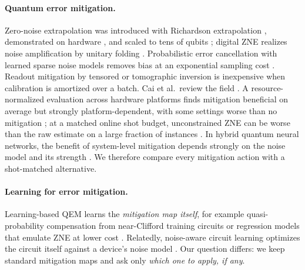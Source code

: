 \documentclass[11pt]{article}
\begin{document}
\paragraph{Quantum error mitigation.}
Zero-noise extrapolation was introduced with Richardson extrapolation \citep{temme2017error}, demonstrated on hardware \citep{kandala2019error}, and scaled to tens of qubits \citep{kim2023scalable}; digital ZNE realizes noise amplification by unitary folding \citep{giurgicatiron2020digital}.
Probabilistic error cancellation with learned sparse noise models removes bias at an exponential sampling cost \citep{vandenberg2023probabilistic}.
Readout mitigation by tensored or tomographic inversion \citep{bravyi2021mitigating,maciejewski2020mitigation} is inexpensive when calibration is amortized over a batch.
Cai et al.\ review the field \citep{cai2023quantum}.
A resource-normalized evaluation across hardware platforms finds mitigation beneficial on average but strongly platform-dependent, with some settings worse than no mitigation \citep{russo2023testing}; at a matched online shot budget, unconstrained ZNE can be worse than the raw estimate on a large fraction of instances \citep{zhang2026worse}.
In hybrid quantum neural networks, the benefit of system-level mitigation depends strongly on the noise model and its strength \citep{minguenjiki2026robustness}.
We therefore compare every mitigation action with a shot-matched alternative.

\paragraph{Learning for error mitigation.}
Learning-based QEM learns the \emph{mitigation map itself}, for example quasi-probability compensation from near-Clifford training circuits \citep{strikis2021learning} or regression models that emulate ZNE at lower cost \citep{liao2024machine}.
Relatedly, noise-aware circuit learning optimizes the circuit itself against a device's noise model \citep{cincio2021machine}.
Our question differs: we keep standard mitigation maps and ask only \emph{which one to apply, if any}.
\end{document}
